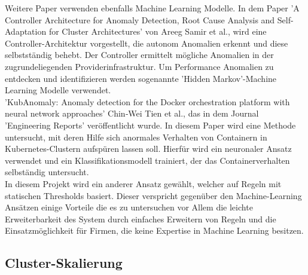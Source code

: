 \documentclass[a4paper,10pt]{scrartcl}
\begin{document}
Weitere Paper verwenden ebenfalls Machine Learning Modelle. In dem Paper 'A Controller Architecture for Anomaly Detection, Root Cause Analysis and Self-Adaptation for Cluster Architectures' von Areeg Samir et al., wird eine Controller-Architektur vorgestellt, die autonom Anomalien erkennt und diese selbstständig behebt. Der Controller ermittelt mögliche Anomalien in der zugrundeliegenden Providerinfrastruktur. Um Performance Anomalien zu entdecken und identifizieren werden sogenannte 'Hidden Markov'-Machine Learning Modelle verwendet.\\

'KubAnomaly: Anomaly detection for the Docker orchestration platform with neural network approaches' Chin‐Wei Tien et al., das in dem Journal 'Engineering Reports' veröffentlicht wurde. In diesem Paper wird eine Methode untersucht, mit deren Hilfe sich anormales Verhalten von Containern in Kubernetes-Clustern aufspüren lassen soll. Hierfür wird ein neuronaler Ansatz verwendet und ein Klassifikationsmodell trainiert, der das Containerverhalten selbständig untersucht.\\
In diesem Projekt wird ein anderer Ansatz gewählt, welcher auf Regeln mit statischen Thresholds basiert. Dieser verspricht gegenüber den Machine-Learning Ansätzen einige Vorteile die es zu untersuchen vor Allem die leichte Erweiterbarkeit des System durch einfaches Erweitern von Regeln und die Einsatzmöglichkeit für Firmen, die keine Expertise in Machine Learning besitzen.

\subsection{Cluster-Skalierung}
\end{document}
